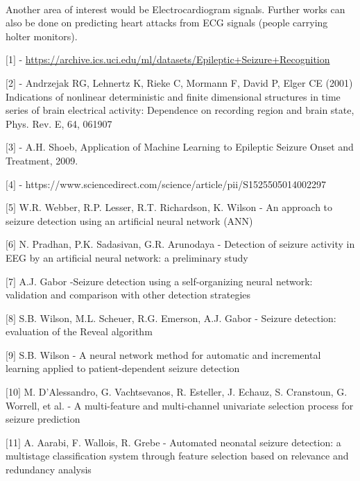 \documentclass{llncs}       %
\begin{document}
\paragraph{}
Another area of interest would be Electrocardiogram signals. Further works can also be done on predicting heart attacks from ECG signals (people carrying holter monitors). 





\begin{thebibliography}{}
%
%



$[$1$]$ - \underline{
https://archive.ics.uci.edu/ml/datasets/Epileptic+Seizure+Recognition}

$[$2$]$ - Andrzejak RG, Lehnertz K, Rieke C, Mormann F, David P, Elger 
CE (2001) Indications of nonlinear deterministic and finite dimensional 
structures in time series of brain electrical activity: Dependence on 
recording region and brain state, Phys. Rev. E, 64, 061907

$[$3$]$ - A.H. Shoeb, Application of Machine Learning to Epileptic 
Seizure Onset and Treatment, 2009.

$[$4$]$ - 
https://www.sciencedirect.com/science/article/pii/S1525505014002297

$[$5$]$ W.R. Webber, R.P. Lesser, R.T. Richardson, K. Wilson - An 
approach to seizure detection using an artificial neural network (ANN)

$[$6$]$ N. Pradhan, P.K. Sadasivan, G.R. Arunodaya - Detection of 
seizure activity in EEG by an artificial neural network: a preliminary 
study

$[$7$]$ A.J. Gabor -Seizure detection using a self-organizing neural 
network: validation and comparison with other detection strategies

$[$8$]$ S.B. Wilson, M.L. Scheuer, R.G. Emerson, A.J. Gabor - Seizure 
detection: evaluation of the Reveal algorithm

$[$9$]$ S.B. Wilson - A neural network method for automatic and 
incremental learning applied to patient-dependent seizure detection

$[$10$]$ M. D'Alessandro, G. Vachtsevanos, R. Esteller, J. Echauz, S. 
Cranstoun, G. Worrell, et al. - A multi-feature and multi-channel 
univariate selection process for seizure prediction

$[$11$]$ A. Aarabi, F. Wallois, R. Grebe - Automated neonatal seizure 
detection: a multistage classification system through feature selection 
based on relevance and redundancy analysis


\end{thebibliography}
\end{document}
